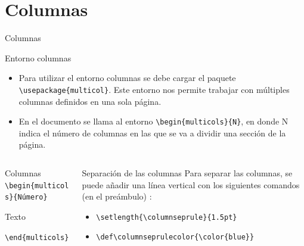 \documentclass[aspectratio=169, 10pt]{beamer}
\begin{document}
\section{Columnas}
\begin{frame}[fragile]{Columnas}
    \begin{exampleblock}{Entorno columnas} \pause
    \begin{itemize}
        \item Para utilizar el entorno columnas se debe cargar el paquete \verb|\usepackage{multicol}|. Este entorno nos permite trabajar con múltiples columnas definidos en una sola página. \pause
        \item En el documento se llama al entorno \verb|\begin{multicols}{N}|, en donde N indica el número de columnas en las que se va a dividir una sección de la página.  
        \end{itemize}
         
    \end{exampleblock}

\begin{columns}
    \begin{column}{.4\linewidth} 
        \begin{block}{Columnas} \pause
            \verb|\begin{multicols}{Número}|
        
        \pause
        
        \hspace{0.2cm}     Texto
        
        \pause
        
            \verb|\end{multicols}|
    \end{block}
\end{column}

\begin{column}{.55\linewidth} 
\begin{block}{Separación de las columnas} \pause
    Para separar las columnas, se puede añadir una línea vertical con los siguientes comandos (en el preámbulo) : \pause
    \begin{itemize}
        \item \verb|\setlength{\columnseprule}{1.5pt}| \pause
        \item \verb|\def\columnseprulecolor{\color{blue}}| 
    \end{itemize}
\end{block}
    \end{column}
\end{columns}
\end{frame}
\end{document}
